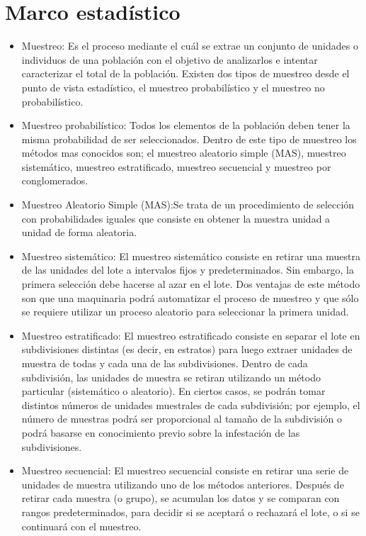 \section{Marco estad\'{i}stico}
\begin{itemize}
\item Muestreo: Es el proceso mediante el cu\'{a}l se extrae un conjunto de unidades o individuos de una poblaci\'{o}n con el objetivo de analizarlos e intentar caracterizar el total de la poblaci\'{o}n. Existen dos tipos de muestreo desde el punto de vista estad\'{i}stico, el muestreo probabil\'{i}stico y el muestreo no probabil\'{i}stico.
\item Muestreo probabil\'{i}stico: Todos los elementos de la poblaci\'{o}n deben tener la misma probabilidad de ser seleccionados. Dentro de este tipo de muestreo los m\'{e}todos mas conocidos son; el muestreo aleatorio simple (MAS), muestreo sistem\'{a}tico, muestreo estratificado, muestreo secuencial y muestreo por conglomerados.
\item Muestreo Aleatorio Simple (MAS):Se trata de un procedimiento de selecci\'{o}n con probabilidades iguales que consiste en obtener la muestra unidad a unidad de forma aleatoria.\cite{M}
\item Muestreo sistem\'{a}tico: El muestreo sistem\'{a}tico consiste en retirar una muestra de las unidades del lote a intervalos fijos y predeterminados. Sin embargo, la primera selecci\'{o}n debe hacerse al azar en el lote. Dos ventajas de este m\'{e}todo son que una maquinaria podr\'{a} automatizar el proceso de muestreo y que s\'{o}lo se requiere utilizar un proceso aleatorio para seleccionar la primera unidad.\cite{MUES}
\item Muestreo estratificado: El muestreo estratificado consiste en separar el lote en subdivisiones distintas (es decir, en estratos) para luego extraer
unidades de muestra de todas y cada una de las subdivisiones. Dentro de cada subdivisi\'{o}n, las unidades de muestra se retiran utilizando un m\'{e}todo particular (sistem\'{a}tico o aleatorio). En ciertos casos, se podr\'{a}n tomar distintos n\'{u}meros de unidades muestrales de cada subdivisi\'{o}n; por ejemplo, el n\'{u}mero de muestras podr\'{a} ser proporcional al tama\~{n}o de la subdivisi\'{o}n o podr\'{a} basarse en conocimiento previo sobre la infestaci\'{o}n de las subdivisiones.\cite{MUES}
\item Muestreo secuencial: El muestreo secuencial consiste en retirar una serie de unidades de muestra utilizando uno de los m\'{e}todos anteriores. Despu\'{e}s de retirar cada muestra (o grupo), se acumulan los datos y se comparan con rangos predeterminados, para decidir si se aceptar\'{a} o rechazar\'{a} el lote, o si se continuar\'{a} con el muestreo.\cite{MUES}

\end{itemize}

